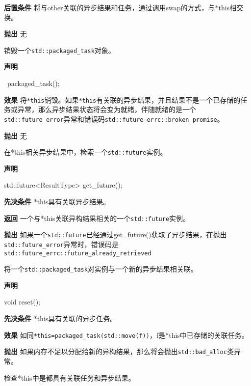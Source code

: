 \textbf{后置条件}
将与other关联的异步结果和任务，通过调用swap的方式，与*this相交换。

\textbf{抛出}
无


销毁一个\texttt{std::packaged\_task}对象。

\textbf{声明}

\begin{cpp}
~packaged_task();
\end{cpp}

\textbf{效果}
将\texttt{*this}销毁。如果\texttt{*this}有关联的异步结果，并且结果不是一个已存储的任务或异常，那么异步结果状态将会变为就绪，伴随就绪的是一个\texttt{std::future\_error}异常和错误码\texttt{std::future\_errc::broken\_promise}。

\textbf{抛出}
无


在*this相关异步结果中，检索一个\texttt{std::future}实例。

\textbf{声明}

\begin{cpp}
std::future<ResultType> get_future();
\end{cpp}

\textbf{先决条件}
*this具有关联异步结果。

\textbf{返回}
一个与*this关联异构结果相关的一个\texttt{std::future}实例。

\textbf{抛出}
如果一个\texttt{std::future}已经通过get\_future()获取了异步结果，在抛出\texttt{std::future\_error}异常时，错误码是\texttt{std::future\_errc::future\_already\_retrieved}


将一个\texttt{std::packaged\_task}对实例与一个新的异步结果相关联。

\textbf{声明}

\begin{cpp}
void reset();
\end{cpp}

\textbf{先决条件}
*this具有关联的异步任务。

\textbf{效果}
如同\texttt{*this=packaged\_task(std::move(f))}，f是*this中已存储的关联任务。

\textbf{抛出}
如果内存不足以分配给新的异构结果，那么将会抛出\texttt{std::bad\_alloc}类异常。


检查*this中是都具有关联任务和异步结果。

